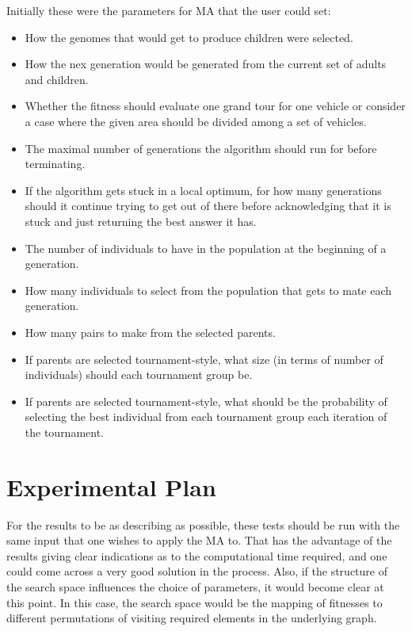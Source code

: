 Initially these were the parameters for MA that the user could set:
\begin{itemize}
    \item How the genomes that would get to produce children were selected.
    \item How the nex generation would be generated from the current set of adults and children.
    \item Whether the fitness should evaluate one grand tour for one vehicle or consider a case where the given area should be divided among a set of vehicles.
    \item The maximal number of generations the algorithm should run for before terminating.
    \item If the algorithm gets stuck in a local optimum, for how many generations should it continue trying to get out of there before acknowledging that it is stuck and just returning the best answer it has.
    \item The number of individuals to have in the population at the beginning of a generation.
    \item How many individuals to select from the population that gets to mate each generation.
    \item How many pairs to make from the selected parents.
    \item If parents are selected tournament-style, what size (in terms of number of individuals) should each tournament group be.
    \item If parents are selected tournament-style, what should be the probability of selecting the best individual from each tournament group each iteration of the tournament.

\end{itemize}

\section{Experimental Plan} %
\label{sec:experimental_plan}
For the results to be as describing as possible, these tests should be run with the same input that one wishes to apply the MA to. That has the advantage of the results giving clear indications as to the computational time required, and one could come across a very good solution in the process. Also, if the structure of the search space influences the choice of parameters, it would become clear at this point. In this case, the search space would be the mapping of fitnesses to different permutations of visiting required elements in the underlying graph.


